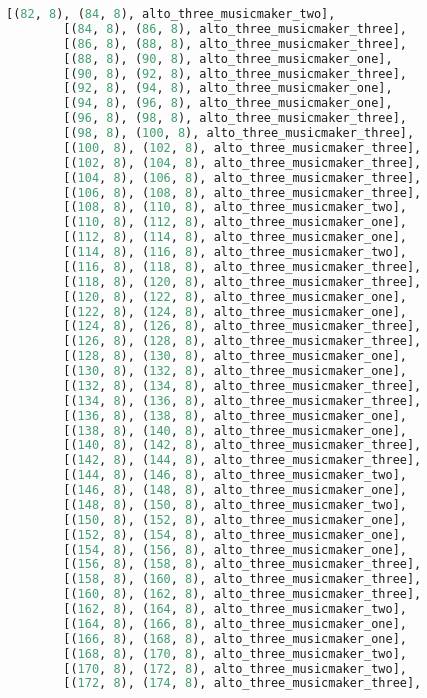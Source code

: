 \begin{lstlisting}[language=Python, caption=Invocation Source Code]
        [(82, 8), (84, 8), alto_three_musicmaker_two],
        [(84, 8), (86, 8), alto_three_musicmaker_three],
        [(86, 8), (88, 8), alto_three_musicmaker_three],
        [(88, 8), (90, 8), alto_three_musicmaker_one],
        [(90, 8), (92, 8), alto_three_musicmaker_three],
        [(92, 8), (94, 8), alto_three_musicmaker_one],
        [(94, 8), (96, 8), alto_three_musicmaker_one],
        [(96, 8), (98, 8), alto_three_musicmaker_three],
        [(98, 8), (100, 8), alto_three_musicmaker_three],
        [(100, 8), (102, 8), alto_three_musicmaker_three],
        [(102, 8), (104, 8), alto_three_musicmaker_three],
        [(104, 8), (106, 8), alto_three_musicmaker_three],
        [(106, 8), (108, 8), alto_three_musicmaker_three],
        [(108, 8), (110, 8), alto_three_musicmaker_two],
        [(110, 8), (112, 8), alto_three_musicmaker_one],
        [(112, 8), (114, 8), alto_three_musicmaker_one],
        [(114, 8), (116, 8), alto_three_musicmaker_two],
        [(116, 8), (118, 8), alto_three_musicmaker_three],
        [(118, 8), (120, 8), alto_three_musicmaker_three],
        [(120, 8), (122, 8), alto_three_musicmaker_one],
        [(122, 8), (124, 8), alto_three_musicmaker_one],
        [(124, 8), (126, 8), alto_three_musicmaker_three],
        [(126, 8), (128, 8), alto_three_musicmaker_three],
        [(128, 8), (130, 8), alto_three_musicmaker_one],
        [(130, 8), (132, 8), alto_three_musicmaker_one],
        [(132, 8), (134, 8), alto_three_musicmaker_three],
        [(134, 8), (136, 8), alto_three_musicmaker_three],
        [(136, 8), (138, 8), alto_three_musicmaker_one],
        [(138, 8), (140, 8), alto_three_musicmaker_one],
        [(140, 8), (142, 8), alto_three_musicmaker_three],
        [(142, 8), (144, 8), alto_three_musicmaker_three],
        [(144, 8), (146, 8), alto_three_musicmaker_two],
        [(146, 8), (148, 8), alto_three_musicmaker_one],
        [(148, 8), (150, 8), alto_three_musicmaker_two],
        [(150, 8), (152, 8), alto_three_musicmaker_one],
        [(152, 8), (154, 8), alto_three_musicmaker_one],
        [(154, 8), (156, 8), alto_three_musicmaker_one],
        [(156, 8), (158, 8), alto_three_musicmaker_three],
        [(158, 8), (160, 8), alto_three_musicmaker_three],
        [(160, 8), (162, 8), alto_three_musicmaker_three],
        [(162, 8), (164, 8), alto_three_musicmaker_two],
        [(164, 8), (166, 8), alto_three_musicmaker_one],
        [(166, 8), (168, 8), alto_three_musicmaker_one],
        [(168, 8), (170, 8), alto_three_musicmaker_two],
        [(170, 8), (172, 8), alto_three_musicmaker_two],
        [(172, 8), (174, 8), alto_three_musicmaker_three],

\end{lstlisting}
